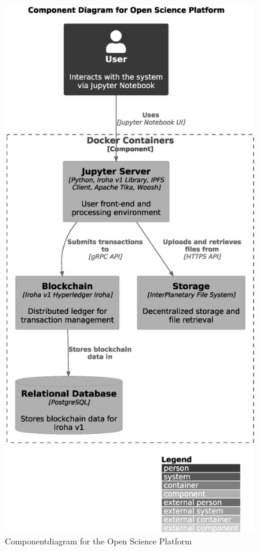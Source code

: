 \documentclass{article}
\begin{document}
\begin{figure}[htbp]
    \centering
    \includegraphics[width=0.98\textwidth, keepaspectratio]{c4_component_diagram.eps}
    \caption{Componentdiagram for the Open Science Platform}
    \label{fig:c4_component_diagram}
\end{figure}
\end{document}
